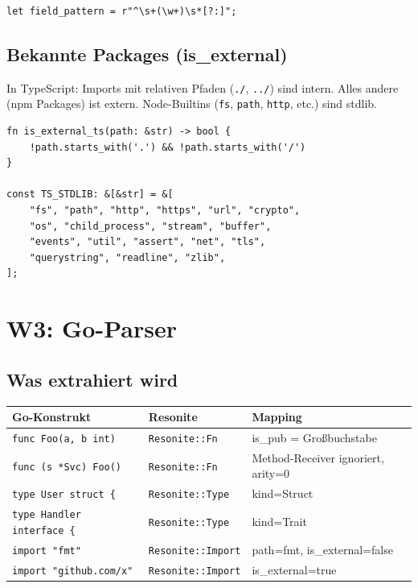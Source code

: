 \documentclass[11pt,a4paper]{article}
\begin{document}
\begin{lstlisting}[style=rust]
let field_pattern = r"^\s+(\w+)\s*[?:]";
\end{lstlisting}

\subsection{Bekannte Packages (is\_external)}

In TypeScript: Imports mit relativen Pfaden 
(\texttt{./}, \texttt{../}) sind intern. Alles andere 
(npm Packages) ist extern. Node-Builtins (\texttt{fs}, 
\texttt{path}, \texttt{http}, etc.) sind stdlib.

\begin{lstlisting}[style=rust]
fn is_external_ts(path: &str) -> bool {
    !path.starts_with('.') && !path.starts_with('/')
}

const TS_STDLIB: &[&str] = &[
    "fs", "path", "http", "https", "url", "crypto",
    "os", "child_process", "stream", "buffer",
    "events", "util", "assert", "net", "tls",
    "querystring", "readline", "zlib",
];
\end{lstlisting}


\section{W3: Go-Parser}
\label{sec:go}

\subsection{Was extrahiert wird}

\begin{longtable}{lp{4cm}p{5cm}}
\toprule
\textbf{Go-Konstrukt} & \textbf{Resonite} & \textbf{Mapping} \\
\midrule
\texttt{func Foo(a, b int)}
  & \texttt{Resonite::Fn}
  & is\_pub = Gro{\ss}buchstabe \\
\texttt{func (s *Svc) Foo()}
  & \texttt{Resonite::Fn}
  & Method-Receiver ignoriert, arity=0 \\
\texttt{type User struct \{}
  & \texttt{Resonite::Type}
  & kind=Struct \\
\texttt{type Handler interface \{}
  & \texttt{Resonite::Type}
  & kind=Trait \\
\texttt{import "fmt"}
  & \texttt{Resonite::Import}
  & path=fmt, is\_external=false \\
\texttt{import "github.com/x"}
  & \texttt{Resonite::Import}
  & is\_external=true \\
\bottomrule
\end{longtable}
\end{document}
